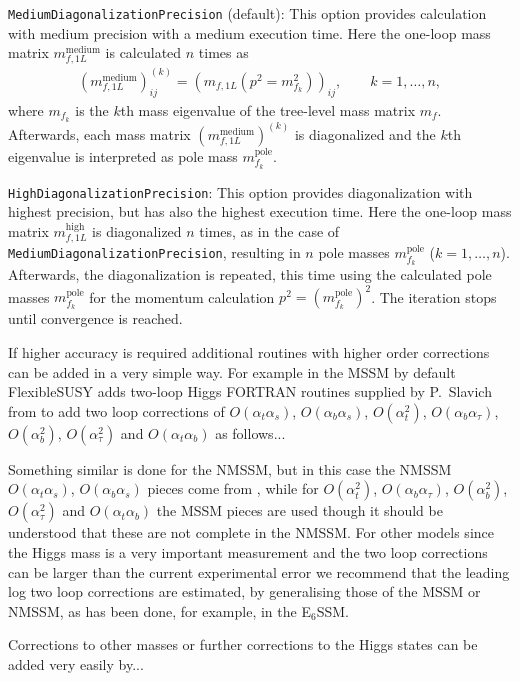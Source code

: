 \documentclass[final,3p,times,pdflatex]{elsarticle}
\newcommand{\fs}{FlexibleSUSY\xspace}
\newcommand{\code}[1]{\lstinline|#1|}  %
\newcommand{\pole}{\text{pole}}
\def\at{\alpha_t}
\def\ab{\alpha_b}
\def\as{\alpha_s}
\def\atau{\alpha_{\tau}}
\def\oatab{O(\at\ab)}
\def\oatas{O(\at\as)}
\def\oabas{O(\ab\as)}
\def\oatq{O(\at^2)}
\def\oabq{O(\ab^2)}
\def\oatauq{O(\atau^2)}
\def\oabatau{O(\ab \atau)}
\begin{document}
\code{MediumDiagonalizationPrecision} (default): This option provides
calculation with medium precision with a medium execution time.  Here
the one-loop mass matrix $m_{f,1L}^\text{medium}$ is calculated $n$
times as
%
\begin{align}
  (m_{f,1L}^\text{medium})_{ij}^{(k)} = (m_{f,1L}(p^2 = m_{f_k}^2))_{ij} ,
  \qquad k = 1,\ldots,n ,
\end{align}
%
where $m_{f_k}$ is the $k$th mass eigenvalue of the tree-level mass
matrix $m_f$.  Afterwards, each mass matrix
$(m_{f,1L}^\text{medium})^{(k)}$ is diagonalized and the $k$th
eigenvalue is interpreted as pole mass $m_{f_k}^\pole$.

\code{HighDiagonalizationPrecision}: This option provides
diagonalization with highest precision, but has also the highest
execution time.  Here the one-loop mass matrix $m_{f,1L}^\text{high}$
is diagonalized $n$ times, as in the case of
\code{MediumDiagonalizationPrecision}, resulting in $n$ pole masses
$m_{f_k}^\pole$ ($k = 1,\ldots,n$).  Afterwards, the diagonalization
is repeated, this time using the calculated pole masses
$m_{f_k}^\pole$ for the momentum calculation $p^2 =
(m_{f_k}^\pole)^2$.  The iteration stops until convergence is reached.

If higher accuracy is required additional routines with higher order
corrections can be added in a very simple way. For example in the MSSM
by default \fs adds two-loop Higgs FORTRAN routines supplied by
P.~Slavich from \cite{slavich-degrassi} to add two loop corrections of
$\oatas$, $\oabas$, $\oatq$, $\oabatau$, $\oabq$, $\oatauq$ and
$\oatab$ as follows...

Something similar is done for the NMSSM, but in this case the NMSSM
$\oatas$, $\oabas$ pieces come from \cite{Degrassi:2009yq}, while for
$\oatq$, $\oabatau$, $\oabq$, $\oatauq$ and $\oatab$ the MSSM pieces
are used though it should be understood that these are not complete in
the NMSSM. For other models since the Higgs mass is a very important
measurement and the two loop corrections can be larger than the
current experimental error \cite{Degrassi:2009yq} we recommend that
the leading log two loop corrections are estimated, by generalising
those of the MSSM or NMSSM, as has been done, for example, in the
E$_6$SSM\cite{King:2005jy}.

Corrections to other masses or further corrections to the Higgs states
can be added very easily by...

\end{document}
